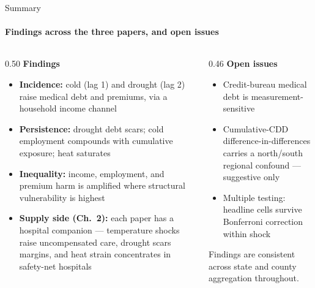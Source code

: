 \documentclass[aspectratio=169,11pt]{beamer}
\newcommand{\emphcolor}[1]{{\color{WarmOrange}\textbf{#1}}}
\newcommand{\tealtext}[1]{{\color{Teal}#1}}
\newcommand{\graytext}[1]{{\color{WarmGray}#1}}
\begin{document}
\begin{frame}{Summary}
  \framesubtitle{Findings across the three papers, and open issues}
  \begin{columns}[T]
    \begin{column}{0.50\textwidth}
      \textbf{\tealtext{Findings}}
      \begin{itemize}\itemsep0.16em
        \item \emphcolor{Incidence:} cold (lag 1) and drought (lag 2) raise medical debt and premiums, via a household income channel
        \item \emphcolor{Persistence:} drought debt scars; cold employment compounds with cumulative exposure; heat saturates
        \item \emphcolor{Inequality:} income, employment, and premium harm is amplified where structural vulnerability is highest
        \item \emphcolor{Supply side (Ch.\ 2):} each paper has a hospital companion --- temperature shocks raise uncompensated care, drought scars margins, and heat strain concentrates in safety-net hospitals
      \end{itemize}
    \end{column}
    \begin{column}{0.46\textwidth}
      \textbf{\tealtext{Open issues}}
      \begin{itemize}\itemsep0.16em
        \item Credit-bureau medical debt is measurement-sensitive
        \item Cumulative-CDD difference-in-differences carries a north/south regional confound --- suggestive only
        \item Multiple testing: headline cells survive Bonferroni correction within shock
      \end{itemize}
      \vspace{0.35em}
      \graytext{\scriptsize Findings are consistent across state and county aggregation throughout.}
    \end{column}
  \end{columns}
\end{frame}
\end{document}
